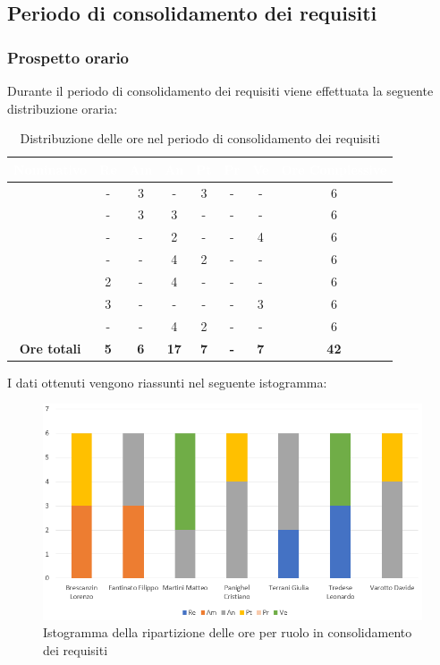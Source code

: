 \subsection{Periodo di consolidamento dei requisiti}
\subsubsection{Prospetto orario}
Durante il periodo di consolidamento dei requisiti viene effettuata la seguente distribuzione oraria:
\begin{table}[H]
	\begin{center}
		\begin{tabular}{ |c c c c c c c c| }
		\rowcolor{darkblue} 
		\textcolor{white}{\textbf{Nominativo}} & \textcolor{white}{\textbf{Re}} & \textcolor{white}{\textbf{Am}} & \textcolor{white}{\textbf{An}} & \textcolor{white}{\textbf{Pt}} & \textcolor{white}{\textbf{Pr}} & \textcolor{white}{\textbf{Ve}} & \textcolor{white}{\textbf{Ore Complessive}} \\ \hline
		\BL 	& - 	& 3  	& - 	& 3 	& - 	& - 	& 6 \\ \hline
		\FF 	& - 	& 3  	& 3 	& - 	& - 	& -  	& 6 \\ \hline
		\MM 	& -  	& -  	& 2 	& - 	& - 	& 4  	& 6 \\ \hline
		\PC 	& - 	& -  	& 4 	& 2 	& - 	& - 	& 6 \\ \hline
		\TG 	& 2  	& - 	& 4 	& - 	& - 	& - 	& 6 \\ \hline
		\TL 	& 3  	& - 	& - 	& - 	& - 	& 3 	& 6 \\ \hline
		\VD 	& -  	& -  	& 4 	& 2 	& - 	& -  	& 6 \\ \hline
		\textbf{Ore totali} & \textbf{5} & \textbf{6} & \textbf{17} & \textbf{7} & \textbf{-} & \textbf{7} & \textbf{42} \\ \hline
		\end{tabular}
	\caption{Distribuzione delle ore nel periodo di consolidamento dei requisiti}
	\end{center}
\end{table}
I dati ottenuti vengono riassunti nel seguente istogramma:
\begin{figure}[H]
    \centering
    \includegraphics[scale = 0.70]{Immagini/ConsolidamentoIsto.png}
    \caption{Istogramma della ripartizione delle ore per ruolo in consolidamento dei requisiti}
    \label{fig:istogramma ripartizione ore, periodo di Consolidamento dei Requisiti}
\end{figure}
\newpage
